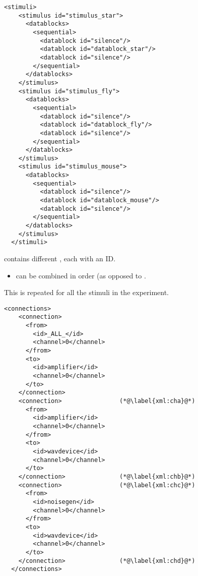    
   

\begin{lstlisting}
<stimuli>
    <stimulus id="stimulus_star">
      <datablocks>
        <sequential>
          <datablock id="silence"/>
          <datablock id="datablock_star"/>
          <datablock id="silence"/>
        </sequential>
      </datablocks>
    </stimulus>
    <stimulus id="stimulus_fly">
      <datablocks>
        <sequential>
          <datablock id="silence"/>
          <datablock id="datablock_fly"/>
          <datablock id="silence"/>
        </sequential>
      </datablocks>
    </stimulus>
    <stimulus id="stimulus_mouse">
      <datablocks>
        <sequential>
          <datablock id="silence"/>
          <datablock id="datablock_mouse"/>
          <datablock id="silence"/>
        </sequential>
      </datablocks>
    </stimulus>
  </stimuli>
\end{lstlisting}
 


 contains different , each with
an ID.

\begin{itemize}\item {}
can be combined in  order (as opposed to
.
\end{itemize}

This is repeated for all the stimuli in the experiment.

  

\begin{lstlisting}
<connections>
    <connection>
      <from>
        <id>_ALL_</id>
        <channel>0</channel>
      </from>
      <to>
        <id>amplifier</id>
        <channel>0</channel>
      </to>
    </connection>
    <connection>                (*@\label{xml:cha}@*)
      <from>
        <id>amplifier</id>
        <channel>0</channel>
      </from>
      <to>
        <id>wavdevice</id>
        <channel>0</channel>
      </to>
    </connection>               (*@\label{xml:chb}@*)
    <connection>                (*@\label{xml:chc}@*)
      <from>
        <id>noisegen</id>
        <channel>0</channel>
      </from>
      <to>
        <id>wavdevice</id>
        <channel>0</channel>
      </to>
    </connection>               (*@\label{xml:chd}@*)
  </connections>

\end{lstlisting}

